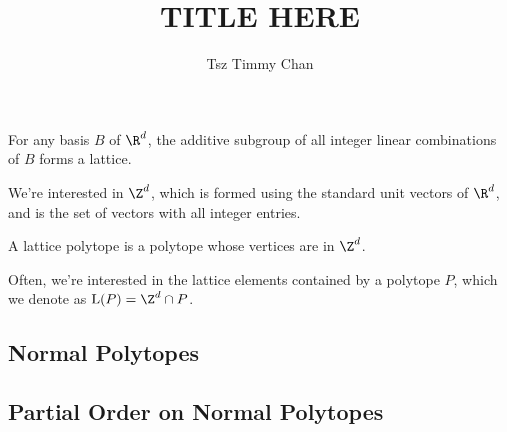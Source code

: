 \documentclass{TC}
\title{TITLE HERE}	%
\author{Tsz Timmy Chan}	%
\begin{document}
\begin{definition}[Lattice in $\R^d$]
For any basis $B$ of $\R^d$, the additive subgroup of all integer linear combinations of $B$ forms a lattice.
\end{definition}

We're interested in $\Z^d$, which is formed using the standard unit vectors of $\R^d$, and is the set of vectors with all integer entries.
 
\begin{definition}
A lattice polytope is a polytope whose vertices are in $\Z^d$.
\end{definition} 

Often, we're interested in the lattice elements contained by a polytope $P$, which we denote as $\mathrm{L}(P) = \Z^d \cap P$.

\subsection{Normal Polytopes}

\subsection{Partial Order on Normal Polytopes}

\end{document}
